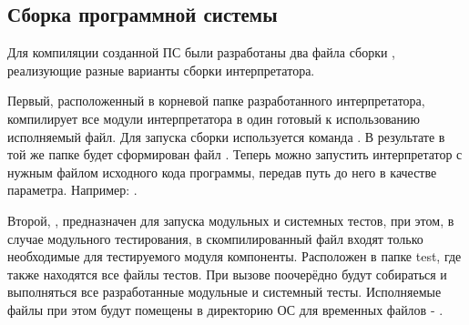 \subsection{Сборка программной системы}
Для компиляции созданной ПС были разработаны два файла сборки  \cite{e8}, реализующие разные варианты сборки интерпретатора.

Первый, расположенный в корневой папке разработанного интерпретатора, компилирует все модули интерпретатора в один готовый к использованию исполняемый файл. Для запуска сборки используется команда . В результате в той же папке будет сформирован файл . Теперь можно запустить интерпретатор с нужным файлом исходного кода программы, передав путь до него в качестве параметра. Например: .

Второй, , предназначен для запуска модульных и системных тестов, при этом, в случае модульного тестирования, в скомпилированный файл входят только необходимые для тестируемого модуля компоненты. Расположен в папке test, где также находятся все файлы тестов. При вызове  поочерёдно будут собираться и выполняться все разработанные модульные и системный тесты. Исполняемые файлы при этом будут помещены в директорию ОС для временных файлов -  \cite{e25}.